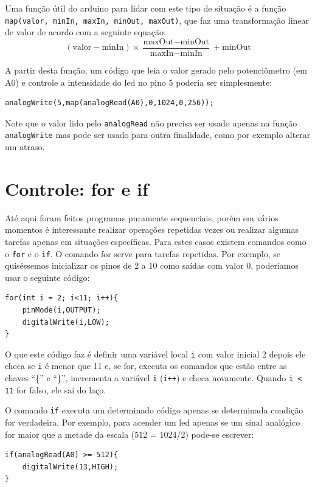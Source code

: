 Uma função útil do arduino para lidar com este tipo de situação é a função \lstinline|map(valor, minIn, maxIn, minOut, maxOut)|, que faz uma transformação linear de valor de acordo com a seguinte equação:
\begin{equation*}
(\text{valor} - \text{minIn}) \times \frac{\text{maxOut} - \text{minOut}}{\text{maxIn} - \text{minIn}} + \text{minOut}
\end{equation*}

A partir desta função, um código que leia o valor gerado pelo potenciômetro (em A0) e controle a intensidade do led no pino 5 poderia ser simplesmente:
\begin{lstlisting}
analogWrite(5,map(analogRead(A0),0,1024,0,256));
\end{lstlisting}

Note que o valor lido pelo \lstinline|analogRead| não precisa ser usado apenas na função \lstinline|analogWrite| mas pode ser usado para outra finalidade, como por exemplo alterar um atraso.
  
\section{Controle: for e if}
Até aqui foram feitos programas puramente sequenciais, porém em vários momentos é interessante realizar operações repetidas vezes ou realizar algumas tarefas apenas em situações específicas. Para estes casos existem comandos como o \lstinline|for| e o \lstinline|if|.
O comando for serve para tarefas repetidas. Por exemplo, se quiséssemos inicializar os pinos de 2 a 10 como saídas com valor 0, poderíamos usar o seguinte código:
\begin{lstlisting}
for(int i = 2; i<11; i++){
	pinMode(i,OUTPUT);
	digitalWrite(i,LOW);
}	
\end{lstlisting}
O que este código faz é definir uma variável local \lstinline|i| com valor inicial 2 depois ele checa se \lstinline|i| é menor que 11 e, se for, executa os comandos que estão entre as chaves ``\{'' e ``\}'', incrementa a variável \lstinline|i| (\lstinline|i++|) e checa novamente. Quando \lstinline|i < 11| for falso, ele sai do laço.

O comando \lstinline|if| executa um determinado código apenas se determinada condição for verdadeira. Por exemplo, para acender um led apenas se um sinal analógico for maior que a metade da escala (512 = 1024/2)  pode-se escrever:
\begin{lstlisting}
if(analogRead(A0) >= 512){
	digitalWrite(13,HIGH);
}
\end{lstlisting}


